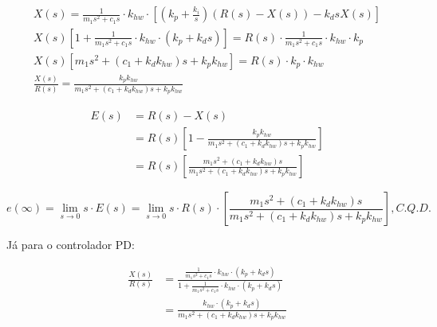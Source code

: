 \documentclass[a4paper,11pt]{article}
\begin{document}
\begin{gather*}
    X\left(s\right) = \frac{1}{m_1 s^2 + c_1 s} \cdot k_{hw} \cdot
        \left[\left(k_p + \frac{k_i}{s}\right)\left(R\left(s\right) -
        X\left(s\right)\right) - k_d s X\left(s\right)\right] \\
    X\left(s\right) \left[ 1 + \frac{1}{m_1 s^2 + c_1 s} \cdot k_{hw} \cdot
        \left(k_p + k_d s \right) \right] =
        R\left(s\right) \cdot \frac{1}{m_1 s^2 + c_1 s} \cdot k_{hw} \cdot
        k_p \\
    X\left(s\right) \left[m_1 s^2 + \left(c_1 + k_d k_{hw}\right) s +
        k_p k_{hw}\right]
        = R\left(s\right) \cdot k_p \cdot k_{hw} \\
    \frac{X\left(s\right)}{R\left(s\right)} = \frac{k_p k_{hw}}
        {m_1 s^2 + \left(c_1 + k_d k_{hw}\right) s + k_p k_{hw}}
\end{gather*}

\begin{align*}
    E\left(s\right) &= R\left(s\right) - X\left(s\right) \\
    &= R\left(s\right) \left[1 - \frac{k_p k_{hw}}
        {m_1 s^2 + \left(c_1 + k_d k_{hw}\right) s + k_p k_{hw}}\right] \\
    &= R\left(s\right) \left[\frac{m_1 s^2 + \left(c_1 + k_d k_{hw}\right) s}
        {m_1 s^2 + \left(c_1 + k_d k_{hw}\right) s + k_p k_{hw}}\right]
\end{align*}

\begin{equation} \label{eq:erro-ped}
    e\left(\infty\right) = \lim_{s \to 0} s \cdot E\left(s\right) =
        \lim_{s \to 0} s \cdot R\left(s\right) \cdot \left[\frac{m_1 s^2 +
        \left(c_1 + k_d k_{hw}\right) s}{m_1 s^2 + \left(c_1 +
        k_d k_{hw}\right) s + k_p k_{hw}}\right], C.Q.D.
\end{equation}

\pagebreak

Já para o controlador PD:

\begin{align*}
    \frac{X\left(s\right)}{R\left(s\right)} &= \frac{\frac{1}{m_1 s^2 + c_1 s} \cdot
        k_{hw} \cdot \left(k_p + k_d s\right)}{1 + \frac{1}{m_1 s^2 + c_1 s} \cdot
        k_{hw} \cdot \left(k_p + k_d s\right)} \\
    &= \frac{k_{hw} \cdot \left(k_p + k_d s\right)}{m_1 s^2 + \left(c_1 +
        k_d k_{hw}\right) s + k_p k_{hw}}
\end{align*}
\end{document}
